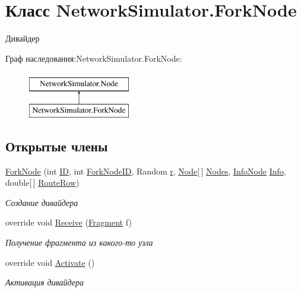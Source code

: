 \hypertarget{class_network_simulator_1_1_fork_node}{}\section{Класс Network\+Simulator.\+Fork\+Node}
\label{class_network_simulator_1_1_fork_node}


Дивайдер  


Граф наследования\+:Network\+Simulator.\+Fork\+Node\+:\begin{figure}[H]
\begin{center}
\leavevmode
\includegraphics[height=2.000000cm]{class_network_simulator_1_1_fork_node}
\end{center}
\end{figure}
\subsection*{Открытые члены}
\begin{DoxyCompactItemize}
\item 
\hyperlink{class_network_simulator_1_1_fork_node_a14a821313420932498ff994b7de90bc9}{Fork\+Node} (int \hyperlink{class_network_simulator_1_1_node_a1ba068212f50babe026c527a9b5fb55a}{ID}, int \hyperlink{class_network_simulator_1_1_fork_node_a13432354bc104beb3ec98ba28d4966cb}{Fork\+Node\+ID}, Random \hyperlink{class_network_simulator_1_1_node_a3eb74310ed895ee8ec49c1850c1c405e}{r}, \hyperlink{class_network_simulator_1_1_node}{Node}\mbox{[}$\,$\mbox{]} \hyperlink{class_network_simulator_1_1_node_abae5930cce02aa93551aefe417b23fa0}{Nodes}, \hyperlink{class_network_simulator_1_1_info_node}{Info\+Node} \hyperlink{class_network_simulator_1_1_node_a63e706d7158c6ea84ea8fdbe61d9bffb}{Info}, double\mbox{[}$\,$\mbox{]} \hyperlink{class_network_simulator_1_1_fork_node_afcdd23cd37381679ba4f364e0c5b1854}{Route\+Row})
\begin{DoxyCompactList}\small\item\em Создание дивайдера \end{DoxyCompactList}\item 
override void \hyperlink{class_network_simulator_1_1_fork_node_aca7a8c482a32868c4a8cb7c319bd866f}{Receive} (\hyperlink{class_network_simulator_1_1_fragment}{Fragment} f)
\begin{DoxyCompactList}\small\item\em Получение фрагмента из какого-\/то узла \end{DoxyCompactList}\item 
override void \hyperlink{class_network_simulator_1_1_fork_node_adbb300697c7a60946cddf9a0ae0e5dc6}{Activate} ()
\begin{DoxyCompactList}\small\item\em Активация дивайдера \end{DoxyCompactList}\end{DoxyCompactItemize}
